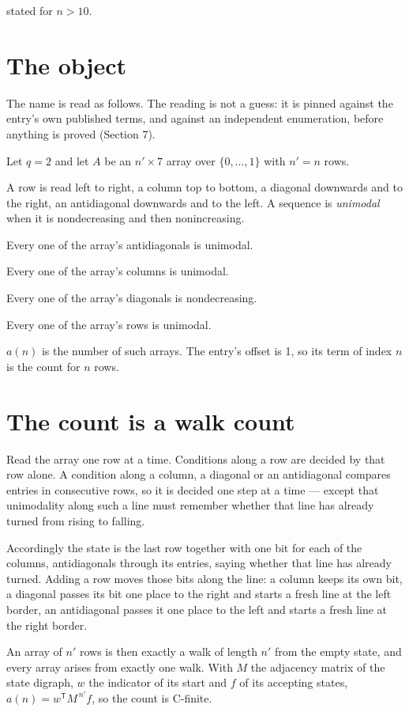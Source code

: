 \documentclass[11pt]{article}
\theoremstyle{definition}
\begin{document}
stated for $n > 10$.

\section{The object}

The name is read as follows. The reading is not a guess: it is pinned against the entry's own published terms, and against an independent enumeration, before anything is proved (Section 7).

Let $q = 2$ and let $A$ be an $n' \times 7$ array over $\{0,\dots,1\}$ with $n' = n$ rows.

A row is read left to right, a column top to bottom, a diagonal downwards and to the right, an antidiagonal downwards and to the left. A sequence is {\itshape unimodal} when it is nondecreasing and then nonincreasing.

Every one of the array's antidiagonals is unimodal.

Every one of the array's columns is unimodal.

Every one of the array's diagonals is nondecreasing.

Every one of the array's rows is unimodal.

$a(n)$ is the number of such arrays. The entry's offset is 1, so its term of index $n$ is the count for $n$ rows.

\section{The count is a walk count}

Read the array one row at a time. Conditions along a row are decided by that row alone. A condition along a column, a diagonal or an antidiagonal compares entries in consecutive rows, so it is decided one step at a time --- except that unimodality along such a line must remember whether that line has already turned from rising to falling.

Accordingly the state is the last row together with one bit for each of the columns, antidiagonals through its entries, saying whether that line has already turned. Adding a row moves those bits along the line: a column keeps its own bit, a diagonal passes its bit one place to the right and starts a fresh line at the left border, an antidiagonal passes it one place to the left and starts a fresh line at the right border.

An array of $n'$ rows is then exactly a walk of length $n'$ from the empty state, and every array arises from exactly one walk. With $M$ the adjacency matrix of the state digraph, $w$ the indicator of its start and $f$ of its accepting states, $a(n) = w^{\mathsf T}M^{\,n'}f$, so the count is C-finite.
\end{document}
